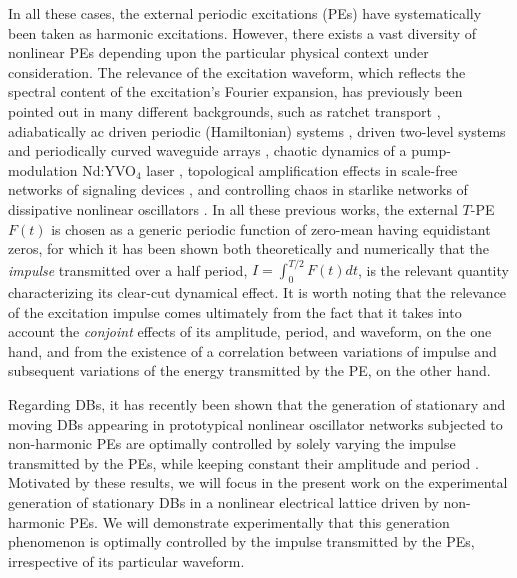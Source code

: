 \documentclass[showpacs,preprintnumbers,10pt,onecolumn]{revtex4}%
\begin{document}
In all these cases, the external periodic excitations (PEs) have systematically been
taken as harmonic excitations. However, there exists a vast
diversity of nonlinear PEs depending upon the particular physical context
under consideration. The relevance of the excitation waveform,
which reflects the spectral content of the excitation's Fourier expansion, has
previously been pointed out in many different backgrounds, such as ratchet
transport \cite{2}, adiabatically ac driven periodic (Hamiltonian) systems
\cite{3}, driven two-level systems and periodically curved waveguide arrays
\cite{4}, chaotic dynamics of a pump-modulation Nd:YVO$_{4}$ laser \cite{5},
topological amplification effects in scale-free networks of signaling devices
\cite{6}, and controlling chaos in starlike networks of dissipative nonlinear
oscillators \cite{7}. In all these previous works, the external $T$-PE $F(t)$
is chosen as a generic periodic function of zero-mean having equidistant
zeros, for which it has been shown both theoretically and numerically that the
\textit{impulse} transmitted over a half period, $I=\int_{0}^{T/2}F(t)dt$, is
the relevant quantity characterizing its clear-cut dynamical effect. It is
worth noting that the relevance of the excitation impulse comes ultimately
from the fact that it takes into account the \textit{conjoint} effects of its
amplitude, period, and waveform, on the one hand, and from the existence of a
correlation between variations of impulse and subsequent variations of the
energy transmitted by the PE, on the other hand.

Regarding DBs, it has recently been shown that the generation of stationary
and moving DBs appearing in prototypical nonlinear oscillator networks
subjected to non-harmonic PEs are optimally controlled by solely varying the
impulse transmitted by the PEs, while keeping constant their amplitude and
period \cite{CCP16}. Motivated by these results, we will focus in the present
work on the experimental generation of stationary DBs in a nonlinear
electrical lattice driven by non-harmonic PEs. We will demonstrate
experimentally that this generation phenomenon is optimally controlled by the impulse transmitted by
the PEs, irrespective of its particular waveform.
\end{document}
